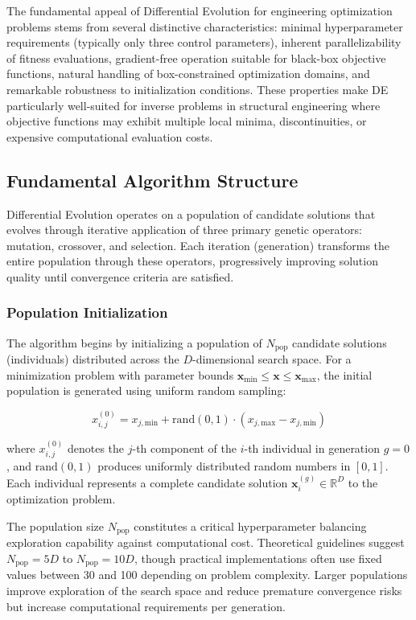 \documentclass[12pt,a4paper]{report}
\begin{document}
The fundamental appeal of Differential Evolution for engineering optimization problems stems from several distinctive characteristics: minimal hyperparameter requirements (typically only three control parameters), inherent parallelizability of fitness evaluations, gradient-free operation suitable for black-box objective functions, natural handling of box-constrained optimization domains, and remarkable robustness to initialization conditions. These properties make DE particularly well-suited for inverse problems in structural engineering where objective functions may exhibit multiple local minima, discontinuities, or expensive computational evaluation costs.

\subsection{Fundamental Algorithm Structure}

Differential Evolution operates on a population of candidate solutions that evolves through iterative application of three primary genetic operators: mutation, crossover, and selection. Each iteration (generation) transforms the entire population through these operators, progressively improving solution quality until convergence criteria are satisfied.

\subsubsection{Population Initialization}

The algorithm begins by initializing a population of $N_{\text{pop}}$ candidate solutions (individuals) distributed across the $D$-dimensional search space. For a minimization problem with parameter bounds $\mathbf{x}_{\text{min}} \leq \mathbf{x} \leq \mathbf{x}_{\text{max}}$, the initial population is generated using uniform random sampling:

\begin{equation}
x_{i,j}^{(0)} = x_{j,\text{min}} + \text{rand}(0,1) \cdot (x_{j,\text{max}} - x_{j,\text{min}})
\end{equation}

where $x_{i,j}^{(0)}$ denotes the $j$-th component of the $i$-th individual in generation $g=0$, and $\text{rand}(0,1)$ produces uniformly distributed random numbers in $[0,1]$. Each individual represents a complete candidate solution $\mathbf{x}_i^{(g)} \in \mathbb{R}^D$ to the optimization problem.

The population size $N_{\text{pop}}$ constitutes a critical hyperparameter balancing exploration capability against computational cost. Theoretical guidelines suggest $N_{\text{pop}} = 5D$ to $N_{\text{pop}} = 10D$, though practical implementations often use fixed values between 30 and 100 depending on problem complexity. Larger populations improve exploration of the search space and reduce premature convergence risks but increase computational requirements per generation.
\end{document}
